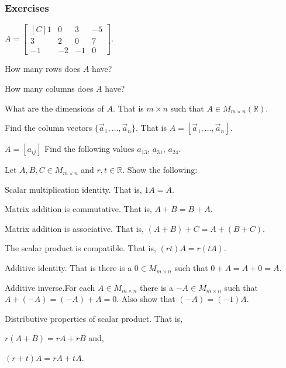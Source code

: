 \subsubsection{Exercises}
\begin{exercise}
$A=\begin{bmatrix*}[C]
1  & 0  & 3  & -5\\
3  & 2  & 0  & 7 \\
-1 & -2 & -1 & 0
\end{bmatrix*}$.\\
\begin{inparaenum}[a.)]
\item How many rows does $A$ have?\\
\item How many columns does $A$ have?\\
\item What are the dimensions of $A$. That is $m \times n$ such that 
$A \in M_{m\times n}(\mathbb{R})$.\\
\item Find the column vectors $\{\vec{a}_1,\ldots,\vec{a}_n\}$. That is
$A=[\vec{a}_1,\ldots,\vec{a}_n]$.\\
\item $A=[a_{ij}]$ Find the following values $a_{13}$, $a_{31}$, $a_{24}$. 
\end{inparaenum}
\end{exercise}
\begin{exercise}
Let $A,B,C \in M_{m\times n}$ and $r,t \in \mathbb{R}$. Show 
the following:\\
\begin{inparaenum}[a.)]
\item Scalar multiplication identity. That is, $1 A=A$.\\
\item Matrix addition is commutative. That is, 
$A+B=B+A$.\\
\item Matrix addition is associative. That is, 
$(A+B)+C=A+(B+C)$.\\
\item The scalar product is compatible. That is, $(rt)A=r(tA)$.\\
\item Additive identity. That is there is a $0\in M_{m\times n}$ such that
 $0+A=A+0=A$.\\
\item Additive inverse.For each $A \in M_{m \times n}$ there is a $-A \in M_{m\times n}$ such 
that $A+(-A)=(-A)+A=0$.
Also show that $(-A)=(-1)A$. \\
\item Distributive properties of scalar product. That is, \\
\begin{inparaenum}[i.)]
\indent \item  $r(A+B)=rA+rB$ and,\\
\indent \item  $(r+t)A=rA+tA$.
\end{inparaenum}
\end{inparaenum} 
\end{exercise}
